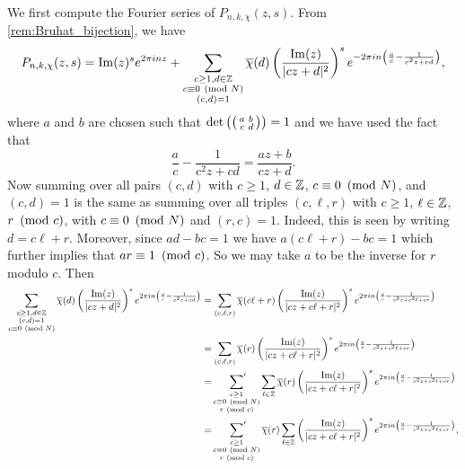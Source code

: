     
    \iffalse
    We first compute the Fourier series of $P_{n,k,\chi}(z,s)$. From \cref{rem:Bruhat_bijection}, we have
    \[
      P_{n,k,\chi}(z,s) = \mathrm{Im}(z)^{s}e^{2\pi inz}+\sum_{\substack{c \ge 1, d \in \mathbb{Z} \\ c \equiv 0 \ \left(\text{mod }N\right) \\ (c,d) = 1}}\overline{\chi}(d)\left(\frac{\mathrm{Im}(z)}{|cz+d|^{2}}\right)^{s}e^{-2\pi in\left(\frac{a}{c}-\frac{1}{c^{2}z+cd}\right)},
    \]
    where $a$ and $b$ are chosen such that $\det\left(\begin{psmallmatrix} a & b \\ c & d \end{psmallmatrix}\right) = 1$ and we have used the fact that
    \[
      \frac{a}{c}-\frac{1}{c^{2}z+cd} = \frac{az+b}{cz+d}.
    \]
    Now summing over all pairs $(c,d)$ with $c \ge 1$, $d \in \mathbb{Z}$, $c \equiv 0 \ \left(\text{mod }N\right)$, and $(c,d) = 1$ is the same as summing over all triples $(c,\ell,r)$ with $c \ge 1$, $\ell \in \mathbb{Z}$, $r \ \left(\text{mod }c\right)$, with $c \equiv 0 \ \left(\text{mod }N\right)$ and $(r,c) = 1$. Indeed, this is seen by writing $d = c\ell+r$. Moreover, since $ad-bc = 1$ we have $a(c\ell+r)-bc = 1$ which further implies that $ar \equiv 1 \ \left(\text{mod }c\right)$. So we may take $a$ to be the inverse for $r$ modulo $c$. Then
    \begin{align*}
      \sum_{\substack{c \ge 1,d \in \mathbb{Z} \\ (c,d) = 1 \\ c \equiv 0 \ \left(\text{mod }N\right)}}\overline{\chi}(d)\left(\frac{\mathrm{Im}(z)}{|cz+d|^{2}}\right)^{s}e^{2\pi in\left(\frac{a}{c}-\frac{1}{c^{2}z+cd}\right)} &= \sum_{(c,\ell,r)}\overline{\chi}(c\ell+r)\left(\frac{\mathrm{Im}(z)}{|cz+c\ell+r|^{2}}\right)^{s}e^{2\pi in\left(\frac{a}{c}-\frac{1}{c^{2}z+c^{2}\ell+cr}\right)} \\
      &= \sum_{(c,\ell,r)}\overline{\chi}(r)\left(\frac{\mathrm{Im}(z)}{|cz+c\ell+r|^{2}}\right)^{s}e^{2\pi in\left(\frac{a}{c}-\frac{1}{c^{2}z+c^{2}\ell+cr}\right)} \\
      &= \sideset{}{'}\sum_{\substack{c \ge 1 \\ c \equiv 0 \ \left(\text{mod }N\right) \\ r \ \left(\text{mod }c\right)}}\sum_{\ell \in \mathbb{Z}}\overline{\chi}(r)\left(\frac{\mathrm{Im}(z)}{|cz+c\ell+r|^{2}}\right)^{s}e^{2\pi in\left(\frac{a}{c}-\frac{1}{c^{2}z+c^{2}\ell+cr}\right)} \\
      &= \sideset{}{'}\sum_{\substack{c \ge 1 \\ c \equiv 0 \ \left(\text{mod }N\right) \\ r \ \left(\text{mod }c\right)}}\overline{\chi}(r)\sum_{\ell \in \mathbb{Z}}\left(\frac{\mathrm{Im}(z)}{|cz+c\ell+r|^{2}}\right)^{s}e^{2\pi in\left(\frac{a}{c}-\frac{1}{c^{2}z+c^{2}\ell+cr}\right)},
    \end{align*}

